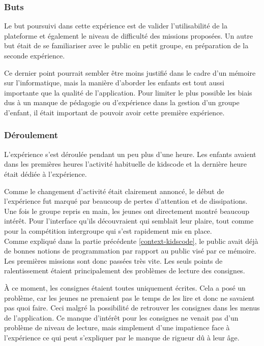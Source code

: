 \subsubsection{Buts}
Le but poursuivi dans cette expérience est de valider l'utilisabilité de la plateforme et également le niveau de difficulté des missions proposées. Un autre but était de se familiariser avec le public en petit groupe, en préparation de la seconde expérience.

Ce dernier point pourrait sembler être moins justifié dans le cadre d'un mémoire sur l'informatique, mais la manière d'aborder les enfants est tout aussi importante que la qualité de l'application. Pour limiter le plus possible les biais dus à un manque de pédagogie ou d'expérience dans la gestion d'un groupe d'enfant, il était important de pouvoir avoir cette première expérience.
\subsubsection{Déroulement}
L'expérience s'est déroulée pendant un peu plus d'une heure. Les enfants avaient dans les premières heures l'activité habituelle de kidscode et la dernière heure était dédiée à l'expérience. 

Comme le changement d'activité était clairement annoncé, le début de l'expérience fut marqué par beaucoup de pertes d'attention et de dissipations. Une fois le groupe repris en main, les jeunes ont directement montré beaucoup intérêt. Pour l'interface qu'ils découvraient qui semblait leur plaire, tout comme pour la compétition intergroupe qui s'est rapidement mis en place.\\

Comme expliqué dans la partie précédente \ref{context-kidscode}, le public avait déjà de bonnes notions de programmation par rapport au public visé par ce mémoire. Les premières missions sont donc passées très vite. Les seuls points de ralentissement étaient principalement des problèmes de lecture des consignes. 

À ce moment, les consignes étaient toutes uniquement écrites. Cela a posé un problème, car les jeunes ne prenaient pas le temps de les lire et donc ne savaient pas quoi faire. Ceci malgré la possibilité de retrouver les consignes dans les menus de l'application. Ce manque d'intérêt pour les consignes ne venait pas d'un problème de niveau de lecture, mais simplement d'une impatience face à l'expérience ce qui peut s'expliquer par le manque de rigueur dû à leur âge.\\

